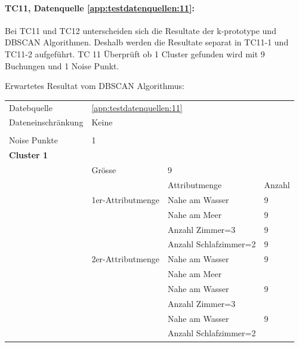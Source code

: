 \paragraph{TC11, Datenquelle \cref{app:testdatenquellen:11}:} Bei TC11 und TC12 unterscheiden sich die Resultate der k-prototype und DBSCAN Algorithmen. Deshalb werden die Resultate separat in TC11-1 und TC11-2 aufgeführt.
TC 11 Überprüft ob 1 Cluster gefunden wird mit 9 Buchungen und 1 Noise Punkt. 

Erwartetes Resultat vom DBSCAN Algorithmus:
\begin{longtable}{ | l | l | l | l |} 	
	\hline 
	\rowcolor{tableheadcolor}
	\multicolumn{4}{|l|}{\bfseries ID: TC11-1 DBSCAN} \\ \hline 
	Datebquelle & \multicolumn{3}{|l|}{\cref{app:testdatenquellen:11}} \\ \hline 
	Dateneinschränkung & \multicolumn{3}{|l|}{Keine} \\ \hline 
	
	\rowcolor{tableheadcolor}
	\multicolumn{4}{|l|}{\bfseries Erwartetes Resultat} \\ \hline 
	Noise Punkte & \multicolumn{3}{|l|}{1} \\ \hline 

	\multicolumn{4}{|l|}{\textbf{Cluster 1}} \\ \cline{2-4} 
	& Grösse & \multicolumn{2}{|l|}{9} \\ \cline{2-4} 
	&& Attributmenge & Anzahl \\ \cline{2-4} 
	
	& 1er-Attributmenge & \tabitem Nahe am Wasser & 9 \\ \cline{3-4} 
	& & \tabitem Nahe am Meer & 9 \\ \cline{3-4} 
	& & \tabitem Anzahl Zimmer=3 & 9 \\ \cline{3-4} 
	& & \tabitem Anzahl Schlafzimmer=2 & 9 \\ \cline{2-4} 
	
	& 2er-Attributmenge & \tabitem Nahe am Wasser & 9 \\
	& & \tabitem Nahe am Meer & \\ \cline{3-4} 
	& & \tabitem Nahe am Wasser & 9 \\
	& & \tabitem Anzahl Zimmer=3 & \\ \cline{3-4} 
	& & \tabitem Nahe am Wasser & 9 \\
	& & \tabitem Anzahl Schlafzimmer=2 & \\ \cline{3-4} 
	

\end{longtable}
